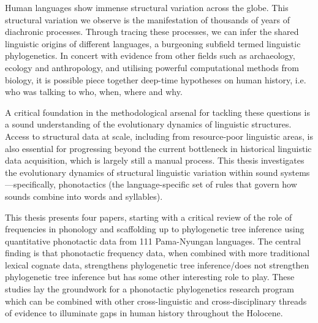 

%

%




Human languages show immense structural variation across the globe. This structural variation we observe is the manifestation of thousands of years of diachronic processes. Through tracing these processes, we can infer the shared linguistic origins of different languages, a burgeoning subfield termed linguistic phylogenetics. In concert with evidence from other fields such as archaeology, ecology and anthropology, and utilising powerful computational methods from biology, it is possible piece together deep-time hypotheses on human history, i.e. who was talking to who, when, where and why.

A critical foundation in the methodological arsenal for tackling these questions is a sound understanding of the evolutionary dynamics of linguistic structures. Access to structural data at scale, including from resource-poor linguistic areas, is also essential for progressing beyond the current bottleneck in historical linguistic data acquisition, which is largely still a manual process. This thesis investigates the evolutionary dynamics of structural linguistic variation within sound systems—specifically, phonotactics (the language-specific set of rules that govern how sounds combine into words and syllables). 

This thesis presents four papers, starting with a critical review of the role of frequencies in phonology and scaffolding up to phylogenetic tree inference using quantitative phonotactic data from 111 Pama-Nyungan languages. The central finding is that phonotactic frequency data, when combined with more traditional lexical cognate data, strengthens phylogenetic tree inference/does not strengthen phylogenetic tree inference but has some other interesting role to play. These studies lay the groundwork for a phonotactic phylogenetics research program which can be combined with other cross-linguistic and cross-disciplinary threads of evidence to illuminate gaps in human history throughout the Holocene.


%